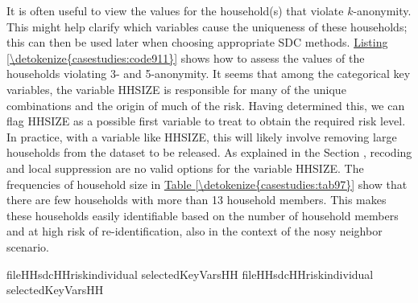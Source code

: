 \documentclass[letterpaper,10pt,english]{sphinxmanual}
\begin{document}
It is often useful to view the values for the household(s) that violate
\(k\)-anonymity. This might help clarify which variables cause the
uniqueness of these households; this can then be used later when
choosing appropriate SDC methods. \hyperref[\detokenize{casestudies:code911}]{Listing \ref{\detokenize{casestudies:code911}}} shows how to assess the
values of the households violating 3- and 5-anonymity. It seems that
among the categorical key variables, the variable HHSIZE is responsible
for many of the unique combinations and the origin of much of the risk.
Having determined this, we can flag HHSIZE as a possible first variable
to treat to obtain the required risk level. In practice, with a variable
like HHSIZE, this will likely involve removing large households from the
dataset to be released. As explained in the Section
, recoding and local
suppression are no valid options for the variable HHSIZE. The
frequencies of household size in \hyperref[\detokenize{casestudies:tab97}]{Table \ref{\detokenize{casestudies:tab97}}} show that there
are few households with more than 13 household members. This makes these
households easily identifiable based on the number of household members
and at high risk of re-identification, also in the context of the nosy
neighbor scenario.

\def\sphinxLiteralBlockLabel{\label{\detokenize{casestudies:code911}}}
%
\begin{sphinxVerbatim}[commandchars=\\\{\},numbers=left,firstnumber=1,stepnumber=1]
fileHH\PYG{p}{[}sdcHHriskindividual\PYG{p}{[}\PYG{p}{]}   selectedKeyVarsHH\PYG{p}{]} 
fileHH\PYG{p}{[}sdcHHriskindividual\PYG{p}{[}\PYG{p}{]}   selectedKeyVarsHH\PYG{p}{]} 
\end{sphinxVerbatim}
\end{document}
